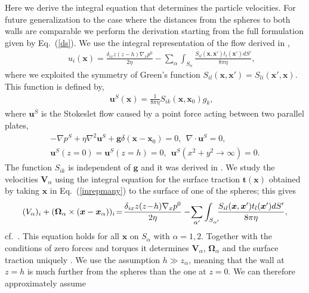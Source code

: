 Here we derive the integral equation that determines the particle velocities. For future generalization to the case where the distances from the spheres to both walls are comparable we perform the derivation starting from the full formulation given by Eq.~(\ref{ds}).
We use the integral representation of the flow derived in \cite{Fouxon_2017},
\begin{eqnarray}&&\!\!\!\!\!\!\!\!\!
u_i(\bm x)\!=\!\frac{\delta_{ix}z(z\!-\!h)\nabla_x p^0}{2\eta}\!-\!\sum_{\alpha}\int_{S_{\alpha}}\!\!\!\frac{S_{il}(\bm x, \bm x')t_{l}(\bm x')dS'}{8\pi \eta},\label{inrepmany}
\end{eqnarray}
where we exploited the symmetry \citep{ps} of Green's function $S_{il}(\bm x, \bm x')=S_{li}(\bm x', \bm x)$. This function is defined by,
\begin{eqnarray}&&\!\!\!\!\!\!\!\!\!\!
\bm u^S(\bm x)=\frac{1}{8\pi \eta}S_{ik}(\bm x, \bm x_0)g_k, \label{vl}
\end{eqnarray}
where $\bm u^S$ is the Stokeslet flow caused by a point force acting between two parallel plates,
\begin{equation}
  \begin{aligned}
-\nabla p^S+\eta \nabla^2 \bm u^S+\bm g\delta(\bm x-\bm x_0)=0,\ \ \nabla\cdot\bm u^S=0, \\  \bm u^S(z=0)=\bm u^S(z=h)=0,\ \ \bm u^S(x^2+y^2\to\infty)=0.\label{stokes1}
  \end{aligned}
\end{equation}
The function $S_{ik}$ is independent of $\bm g$ and it was derived in \cite{LironMochon}. We study the velocities $\bm V_{\alpha}$ using the integral equation for the surface traction $\bm t(\bm x)$ obtained by taking
$\bm x$ in Eq.~(\ref{inrepmany}) to the surface of one of the spheres; this gives
\begin{equation}%
  \small
(V_{\alpha})_i+(\bm \Omega_{\alpha}\times (\bm x-\bm x_{\alpha}))_i\!=\!\frac{\delta_{ix}z(z\!-\!h)\nabla_x p^0}{2\eta}
-\!\sum_{\alpha'}\int_{S_{\alpha'}}\!\!\!\frac{S_{il}(\bm x, \bm x')t_{l}(\bm x')dS'}{8\pi \eta}, \label{intr1}
\end{equation}
cf.\ \cite{ps}. This equation holds for all $\bm x$ on $S_{\alpha}$ with $\alpha=1, 2$. Together with the conditions of zero forces and torques it determines $\bm V_{\alpha}$, $\bm \Omega_{\alpha}$ and the surface traction
uniquely \citep{kim_karrila}. We use the assumption $h\gg z_{\alpha}$, meaning that the wall at $z=h$ is much further from the spheres than the one at $z=0$. We can therefore approximately assume
